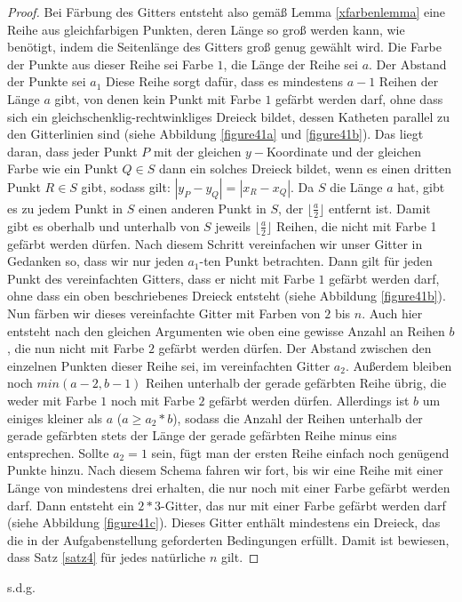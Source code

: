 \documentclass[12pt]{article}
\numberwithin{equation}{subsection}
\begin{document}
\begin{proof}
Bei Färbung des Gitters entsteht also gemäß Lemma \ref{xfarbenlemma} eine Reihe aus gleichfarbigen Punkten, deren Länge so groß werden kann, wie benötigt, indem die Seitenlänge des Gitters groß genug gewählt wird. Die Farbe der Punkte aus dieser Reihe sei Farbe $1$, die Länge der Reihe sei $a$. Der Abstand der Punkte sei $a_1$
Diese Reihe sorgt dafür, dass es mindestens $a-1$ Reihen der Länge $a$ gibt, von denen kein Punkt mit Farbe $1$ gefärbt werden darf, ohne dass sich ein gleichschenklig-rechtwinkliges Dreieck bildet, dessen Katheten parallel zu den Gitterlinien sind (siehe Abbildung \ref{figure41a} und \ref{figure41b}). Das liegt daran, dass jeder Punkt $P$ mit der gleichen $y-$Koordinate und der gleichen Farbe wie ein Punkt $Q\in S$ dann ein solches Dreieck bildet, wenn es einen dritten Punkt $R\in S$ gibt, sodass gilt:
$|y_P-y_Q|=|x_R-x_Q|$. Da $S$ die Länge $a$ hat, gibt es zu jedem Punkt in $S$ einen anderen Punkt in $S$, der $\lfloor\frac{a}{2}\rfloor$ entfernt ist. Damit gibt es oberhalb und unterhalb von $S$ jeweils $\lfloor\frac{a}{2}\rfloor$ Reihen, die nicht mit Farbe 1 gefärbt werden dürfen. Nach diesem Schritt vereinfachen wir unser Gitter in Gedanken so, dass wir nur jeden $a_1$-ten Punkt betrachten. Dann gilt für jeden Punkt des vereinfachten Gitters, dass er nicht mit Farbe $1$ gefärbt werden darf, ohne dass ein oben beschriebenes Dreieck entsteht (siehe Abbildung \ref{figure41b}).
Nun färben wir dieses vereinfachte Gitter mit Farben von $2$ bis $n$. Auch hier entsteht nach den gleichen Argumenten wie oben eine gewisse Anzahl an Reihen $b$, die nun nicht mit Farbe $2$ gefärbt werden dürfen. Der Abstand zwischen den einzelnen Punkten dieser Reihe sei, im vereinfachten Gitter $a_2$. 
Außerdem bleiben noch $min(a-2,b-1)$ Reihen unterhalb der gerade gefärbten Reihe übrig, die weder mit Farbe $1$ noch mit Farbe $2$ gefärbt werden dürfen. Allerdings ist $b$ um einiges kleiner als $a$ ($a\ge a_2*b$), sodass die Anzahl der Reihen unterhalb der gerade gefärbten stets der Länge der gerade gefärbten Reihe minus eins entsprechen. Sollte $a_2=1$ sein, fügt man der ersten Reihe einfach noch genügend Punkte hinzu.
Nach diesem Schema fahren wir fort, bis wir eine Reihe mit einer Länge von mindestens drei erhalten, die nur noch mit einer Farbe gefärbt werden darf. Dann entsteht ein $2*3$-Gitter, das nur mit einer Farbe gefärbt werden darf (siehe Abbildung \ref{figure41c}). Dieses Gitter enthält mindestens ein Dreieck, das die in der Aufgabenstellung geforderten Bedingungen erfüllt.
Damit ist bewiesen, dass Satz \ref{satz4} für jedes natürliche $n$ gilt.
\end{proof}
s.d.g.
\end{document}
